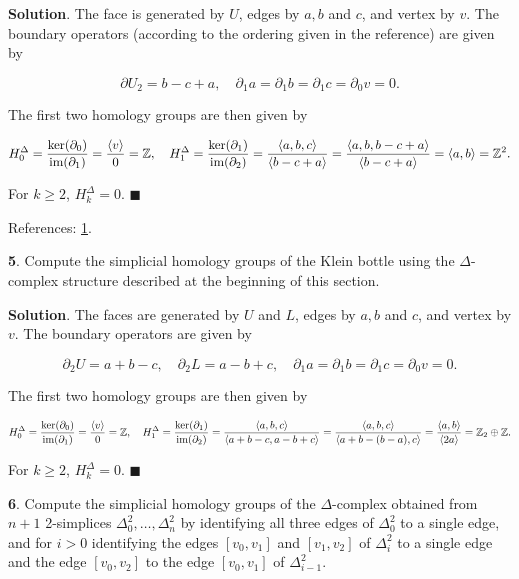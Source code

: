 \documentclass{article}
\newcommand{\Z}{\mathbb{Z}}
\newcommand{\im}{\textnormal{im}}
\begin{document}
\textbf{Solution}. The face is generated by $U$, edges by $a, b$ and $c$, and vertex by $v$. The boundary operators (according to the ordering given in the reference) are given by

$$\partial U_{2} = b - c + a,\quad \partial_{1} a = \partial_{1} b = \partial_{1} c = \partial_{0} v = 0.$$

The first two homology groups are then given by

$$H^{\Delta}_{0} = \frac{\ker (\partial_{0})}{\im(\partial_{1})} = \frac{\langle v\rangle}{0} = \Z,\quad H^{\Delta}_{1} = \frac{\ker (\partial_{1})}{\im(\partial_{2})} = \frac{\langle a, b, c\rangle}{\langle b-c+a\rangle} = \frac{\langle a, b, b-c+a\rangle}{\langle b-c+a\rangle} = \langle a, b\rangle = \Z^{2}.$$

For $k\geq 2$, $H_{k}^{\Delta} = 0$. $\blacksquare$
\medskip

References: \href{http://web.math.ku.dk/~moller/blok1_05/AT-ex.pdf}{1}.
\bigskip
\bigskip

\textbf{5}. Compute the simplicial homology groups of the Klein bottle using the $\Delta$-complex structure described at the beginning of this section.
\medskip

\textbf{Solution}. The faces are generated by $U$ and $L$, edges by $a, b$ and $c$, and vertex by $v$. The boundary operators are given by

$$\partial_{2} U = a + b - c,\quad \partial_{2} L = a - b + c,\quad \partial_{1} a = \partial_{1} b = \partial_{1} c = \partial_{0} v = 0.$$

The first two homology groups are then given by

$$H^{\Delta}_{0} = \frac{\ker (\partial_{0})}{\im(\partial_{1})} = \frac{\langle v\rangle}{0} = \Z,\quad H^{\Delta}_{1} = \frac{\ker (\partial_{1})}{\im(\partial_{2})} = \frac{\langle a, b, c\rangle}{\langle a+b-c, a-b+c\rangle} = \frac{\langle a, b, c\rangle}{\langle a + b - (b - a), c\rangle} = \frac{\langle a, b\rangle}{\langle 2a\rangle} = \Z_{2}\oplus \Z.$$

For $k\geq 2$, $H_{k}^{\Delta} = 0$. $\blacksquare$
\bigskip
\bigskip

\textbf{6}. Compute the simplicial homology groups of the $\Delta$-complex obtained from $n+1$ 2-simplices $\Delta_{0}^{2},\ldots, \Delta_{n}^{2}$ by identifying all three edges of $\Delta_{0}^{2}$ to a single edge, and for $i > 0$ identifying the edges $[v_{0}, v_{1}]$ and $[v_{1}, v_{2}]$ of $\Delta_{i}^{2}$ to a single edge and the edge $[v_{0}, v_{2}]$ to the edge $[v_{0}, v_{1}]$ of $\Delta_{i-1}^{2}$.
\medskip
\end{document}
